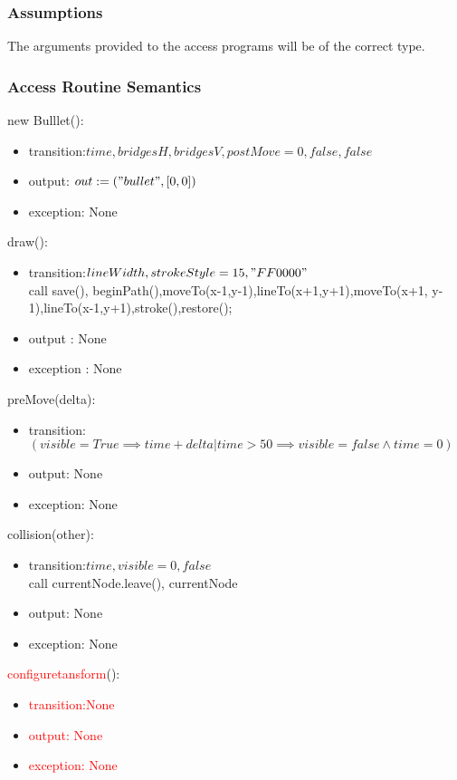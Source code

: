 \documentclass[12pt]{article}
\begin{document}
\subsubsection* {Assumptions}

The arguments provided to the access programs will be of the correct type.

\subsubsection* {Access Routine Semantics}

\noindent new Bulllet():
\begin{itemize}
\item transition:$time, bridgesH, bridgesV , postMove = 0,false,false$ 
\item output: $out := ("bullet",[0,0])$
\item exception: None
\end{itemize}

\noindent draw():
\begin{itemize}
\item transition:$lineWidth,strokeStyle = 15,"FF0000"$\\
call save(), beginPath(),moveTo(x-1,y-1),lineTo(x+1,y+1),moveTo(x+1, y-1),lineTo(x-1,y+1),stroke(),restore();
\item output : None
\item exception : None
\end{itemize}

\noindent preMove(delta):
\begin{itemize}
\item transition:$(visible = True \implies time + delta | time > 50 \implies visible = false \wedge time = 0)$
\item output: None
\item exception: None
\end{itemize}


\noindent collision(other):
\begin{itemize}
\item transition:$time , visible = 0, false$\\
call currentNode.leave(), currentNode\\
\item output: None
\item exception: None
\end{itemize}

\noindent \textcolor{red}{configuretansform}():
\begin{itemize}
\item \textcolor{red}{transition:None}
\item \textcolor{red}{output: None}
\item \textcolor{red}{exception: None}
\end{itemize}
\end{document}
